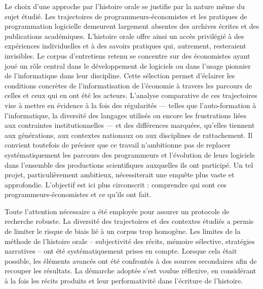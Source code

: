 Le choix d’une approche par l’histoire orale se justifie par la nature même du sujet étudié. Les trajectoires de programmeurs-économistes et les pratiques de programmation logicielle demeurent largement absentes des archives écrites et des publications académiques. L’histoire orale offre ainsi un accès privilégié à des expériences individuelles et à des savoirs pratiques qui, autrement, resteraient invisibles.
Le corpus d’entretiens retenu se concentre sur des économistes ayant joué un rôle central dans le développement de logiciels ou dans l’usage pionnier de l’informatique dans leur discipline. Cette sélection permet d’éclairer les conditions concrètes de l’informatisation de l’économie à travers les parcours de celles et ceux qui en ont été les acteurs.
L’analyse comparative de ces trajectoires vise à mettre en évidence à la fois des régularités — telles que l’auto-formation à l’informatique, la diversité des langages utilisés ou encore les frustrations liées aux contraintes institutionnelles — et des différences marquées, qu’elles tiennent aux générations, aux contextes nationaux ou aux disciplines de rattachement.
Il convient toutefois de préciser que ce travail n’ambitionne pas de replacer systématiquement les parcours des programmeurs et l’évolution de leurs logiciels dans l’ensemble des productions scientifiques auxquelles ils ont participé. Un tel projet, particulièrement ambitieux, nécessiterait une enquête plus vaste et approfondie. L’objectif est ici plus circonscrit : comprendre qui sont ces programmeurs-économistes et ce qu’ils ont fait.


Toute l’attention nécessaire a été employée pour assurer un protocole de recherche robuste.
La diversité des trajectoires et des contextes étudiés a permis de limiter le risque de biais lié à un corpus trop homogène. Les limites de la méthode de l’histoire orale – subjectivité des récits, mémoire sélective, stratégies narratives – ont été systématiquement prises en compte. Lorsque cela était possible, les éléments avancés ont été confrontés à des sources secondaires afin de recouper les résultats. La démarche adoptée s’est voulue réflexive, en considérant à la fois les récits produits et leur performativité dans l’écriture de l’histoire.


















